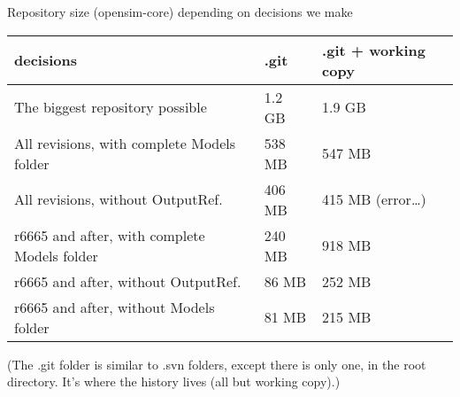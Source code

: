 \documentclass[pdf, 8pt]{beamer}
\begin{document}
\begin{frame}[fragile]{Repository size (opensim-core) depending on decisions we make}
\begin{tabular}{lll}
    decisions & .git & .git + working copy \\ \hline
    The biggest repository possible & 1.2 GB &1.9 GB \\
    All revisions, with complete Models folder & 538 MB & 547 MB \\
    All revisions, without OutputRef. & 406 MB & 415 MB (error\ldots) \\
    r6665 and after, with complete Models folder & 240 MB & 918 MB \\
    r6665 and after, without OutputRef. & 86 MB & 252 MB \\
    r6665 and after, without Models folder & 81 MB & 215 MB \\
\end{tabular}


    \vspace{1cm}
    \vspace{1cm}

    (The .git folder is similar to .svn folders, except there is only one, in
    the root directory. It's where the history lives (all but working copy).)
\end{frame}
\end{document}
